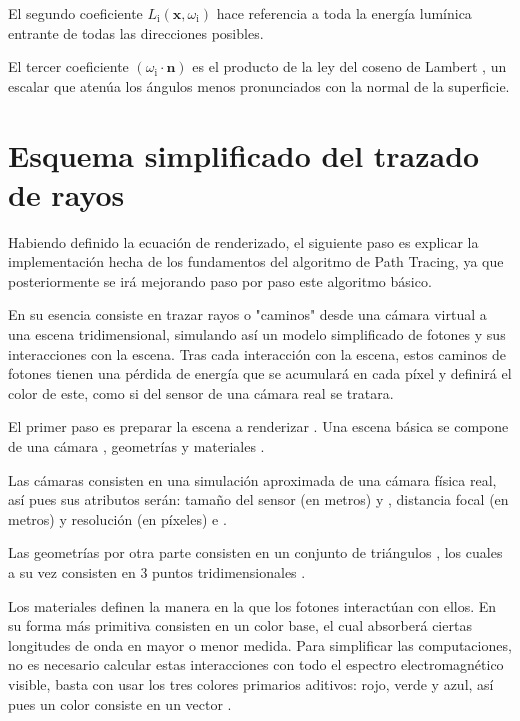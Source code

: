 El segundo coeficiente $L_{\text{i}}(\mathbf {x} ,\omega _{\text{i}})$ hace referencia a toda la energía lumínica entrante de todas las direcciones posibles.

El tercer coeficiente $(\omega _{\text{i}}\cdot \mathbf {n})$ es el producto de la ley del coseno de Lambert \cite{lambert1760jh}, un escalar que atenúa los ángulos menos pronunciados con la normal de la superficie.


	\section{Esquema simplificado del trazado de rayos}
	
Habiendo definido la ecuación de renderizado, el siguiente paso es explicar la implementación hecha de los fundamentos del algoritmo de Path Tracing, ya que posteriormente se irá mejorando paso por paso este algoritmo básico.

En su esencia consiste en trazar rayos o "caminos" desde una cámara virtual a una escena tridimensional, simulando así un modelo simplificado de fotones y sus interacciones con la escena. Tras cada interacción con la escena, estos caminos de fotones tienen una pérdida de energía que se acumulará en cada píxel y definirá el color de este, como si del sensor de una cámara real se tratara.

El primer paso es preparar la escena a renderizar . Una escena básica se compone de una cámara , geometrías  y materiales .

Las cámaras  consisten en una simulación aproximada de una cámara física real, así pues sus atributos serán: tamaño del sensor (en metros)  y , distancia focal (en metros)  y resolución (en píxeles)  e . 

Las geometrías  por otra parte consisten en un conjunto de triángulos , los cuales a su vez consisten en 3 puntos tridimensionales .

Los materiales  definen la manera en la que los fotones interactúan con ellos. En su forma más primitiva consisten en un color base, el cual absorberá ciertas longitudes de onda en mayor o menor medida. Para simplificar las computaciones, no es necesario calcular estas interacciones con todo el espectro electromagnético visible, basta con usar los tres colores primarios aditivos: rojo, verde y azul, así pues un color consiste en un vector .

